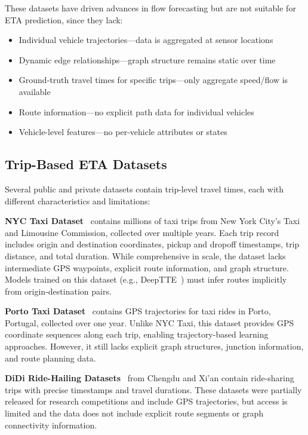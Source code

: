 These datasets have driven advances in flow forecasting but are not suitable for ETA prediction, since they lack:

\begin{itemize}
    \item Individual vehicle trajectories—data is aggregated at sensor locations
    \item Dynamic edge relationships—graph structure remains static over time
    \item Ground-truth travel times for specific trips—only aggregate speed/flow is available
    \item Route information—no explicit path data for individual vehicles
    \item Vehicle-level features—no per-vehicle attributes or states
\end{itemize}

\subsection{Trip-Based ETA Datasets}

Several public and private datasets contain trip-level travel times, each with different characteristics and limitations:

\textbf{NYC Taxi Dataset}~\cite{nyc_tlc} contains millions of taxi trips from New York City's Taxi and Limousine Commission, collected over multiple years. Each trip record includes origin and destination coordinates, pickup and dropoff timestamps, trip distance, and total duration. While comprehensive in scale, the dataset lacks intermediate GPS waypoints, explicit route information, and graph structure. Models trained on this dataset (e.g., DeepTTE~\cite{deepTTE2018}) must infer routes implicitly from origin-destination pairs.

\textbf{Porto Taxi Dataset}~\cite{moreira2013porto} contains GPS trajectories for taxi rides in Porto, Portugal, collected over one year. Unlike NYC Taxi, this dataset provides GPS coordinate sequences along each trip, enabling trajectory-based learning approaches. However, it still lacks explicit graph structures, junction information, and route planning data.

\textbf{DiDi Ride-Hailing Datasets}~\cite{didi2016} from Chengdu and Xi'an contain ride-sharing trips with precise timestamps and travel durations. These datasets were partially released for research competitions and include GPS trajectories, but access is limited and the data does not include explicit route segments or graph connectivity information.

